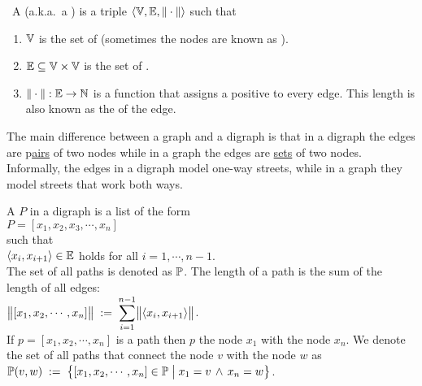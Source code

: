 \begin{Definition} \
  A  (a.k.a.~a ) is a triple 
  $\langle {\mathbb V}, {\mathbb E}, \|\cdot\| \rangle$ such that
  \begin{enumerate}
  \item ${\mathbb V}$ is the set of  (sometimes the nodes are known as ).
  \item ${\mathbb E} \subseteq {\mathbb V} \times {\mathbb V}$ is the set of \blue{edges}.
  \item $\|\cdot\|: {\mathbb E} \rightarrow {\mathbb N}$ is a function that assigns a positive  
        to every edge.  This length is also known as the \blue{weight} of the edge.
        \eox
  \end{enumerate}
\end{Definition}

\remark
The main difference between a graph and a digraph is that in a digraph the edges are 
\mbox{p\hspace{-0.15cm}\underline{\hspace{0.15cm}airs}} of two
nodes while in a graph the edges are \underline{sets} of two nodes.  Informally, the edges in a
digraph model one-way streets, while in a graph they model streets that work both ways.
\eox

\begin{Definition}
 A  $P$ in a digraph is a list of the form 
\\[0.2cm]
\hspace*{1.3cm} 
$P = [ x_1, x_2, x_3, \cdots, x_n ]$ 
\\[0.2cm]
such that
\\[0.2cm]
\hspace*{1.3cm} $\pair(x_i,x_{i+1}) \in \edges$ \quad holds for all $i = 1, \cdots, n-1$. 
\\[0.2cm]
The set of all paths is denoted as ${\mathbb P}$.
The length of a path is the sum of the length of all edges:
\\[0.2cm]
\hspace*{1.3cm}
$\ds\Weight{[x_1,x_2, \cdots, x_n]} \df \sum\limits_{i=1}^{n-1} \Weight{\pair(x_i,x_{i+1})}$. 
\\[0.2cm]
If  $p = [x_1, x_2, \cdots, x_n]$ is a path then  $p$  the node $x_1$ with the node
$x_n$.  We denote the set of all paths that connect the node $v$ with the node $w$ as
\\[0.2cm]
\hspace*{1.3cm} 
 ${\mathbb P}(v,w) \;:=\; \bigl\{ [x_1, x_2, \cdots, x_n] \in {\mathbb P} \bigm| x_1 = v \,\wedge\, x_n = w \bigr\}$.
\end{Definition}

